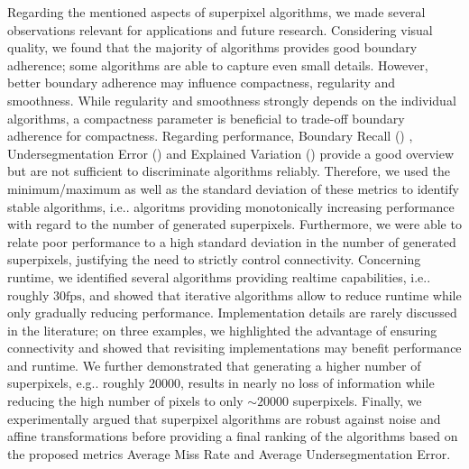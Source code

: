 \documentclass[5p]{elsarticle}
\makeatletter
\DeclareRobustCommand\onedot{\futurelet\@let@token\@onedot}
\def\@onedot{\ifx\@let@token.\else.\null\fi\xspace}
\def\eg{{e.g}\onedot} \def\Eg{{E.g}\onedot}
\def\ie{{i.e}\onedot} \def\Ie{{I.e}\onedot}
\def\AvgRec{Average\allowbreak\xspace Miss Rate\xspace}
\def\AvgUE{Average\allowbreak\xspace Undersegmentation\allowbreak\xspace Error\xspace}
\def\UE{\text{UE}\xspace}
\def\Rec{\text{Rec}\xspace}
\def\EV{\text{EV}\xspace}
\makeatother
\begin{document}
Regarding the mentioned aspects of superpixel algorithms, we made several observations
relevant for applications and future research. Considering visual quality, we found that
the majority of algorithms provides good boundary adherence; some algorithms are
able to capture even small details. However, better boundary adherence may influence compactness,
regularity and smoothness. While regularity and smoothness strongly depends on the individual algorithms,
a compactness parameter is beneficial to trade-off boundary adherence for compactness.
Regarding performance, Boundary Recall (\Rec) \cite{MartinFowlkesMalik:2004},
Undersegmentation Error (\UE) \cite{LevinshteinStereKutulakosFleetDickinsonSiddiqi:2009, AchantaShajiSmithLucchiFuaSuesstrunk:2012, NeubertProtzel:2012}
and Explained Variation (\EV) \cite{MoorePrinceWarrellMohammedJones:2008} provide a
good overview but are not sufficient to discriminate algorithms reliably.
Therefore, we used the minimum/maximum as well as the standard deviation of these metrics
to identify stable algorithms, \ie algoritms providing monotonically increasing
performance with regard to the number of generated superpixels. Furthermore, we were
able to relate poor performance to a high standard deviation in the number of generated superpixels,
justifying the need to strictly control connectivity. Concerning runtime, we identified
several algorithms providing realtime capabilities, \ie roughly $30\text{fps}$, and showed
that iterative algorithms allow to reduce runtime while only gradually reducing performance.
Implementation details are rarely discussed in the literature; on three examples, we highlighted
the advantage of ensuring connectivity and showed that revisiting implementations may benefit performance and runtime.
We further demonstrated that generating a higher number of superpixels, \eg roughly $20000$,
results in nearly no loss of information while reducing the high number of pixels to only $\sim 20000$ superpixels.
Finally, we experimentally argued that superpixel algorithms are robust against noise and
affine transformations before providing a final ranking of the algorithms based on the
proposed metrics \AvgRec and \AvgUE.
\end{document}
